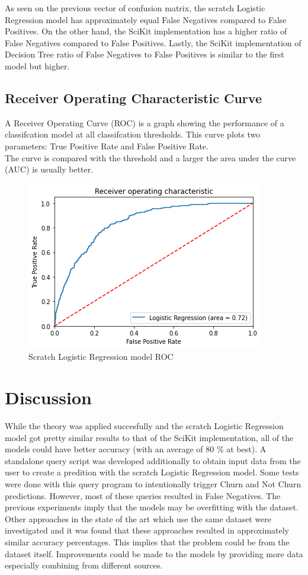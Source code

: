\documentclass[letterpaper, 10 pt, conference]{ieeeconf}
\begin{document}
As seen on the previous vector of confusion matrix, the scratch Logistic Regression model has approximately equal False Negatives compared to False Positives.
On the other hand, the SciKit implementation has a higher ratio of False Negatives compared to False Positives.
Lastly, the SciKit implementation of Decision Tree ratio of False Negatives to False Positives is similar to the first model but higher. 

\subsection{Receiver Operating Characteristic Curve}

A Receiver Operating Curve (ROC) is a graph showing the performance of a classifcation model at all classifcation thresholds. This curve
plots two parameters: True Positive Rate and False Positive Rate. \\

The curve is compared with the threshold and a larger the area under the curve (AUC) is usually better.

\begin{figure}[thpb]
    \centering
    \includegraphics[scale=0.5]{figures/LOR.png}
    \caption{Scratch Logistic Regression model ROC}
    \label{LOR}
 \end{figure}

 
\section{ Discussion }
While the theory was applied succesfully and the scratch Logistic Regression model got pretty similar results to that of the SciKit implementation,
all of the models could have better accuracy (with an average of 80 \% at best). A standalone query script was developed additionally to 
obtain input data from the user to create a predition with the scratch Logistic Regression model. Some tests were done with this query program
to intentionally trigger Churn and Not Churn predictions. However, most of these queries resulted in False Negatives. The previous experiments 
imply that the models may be overfitting with the dataset. Other approaches in the state of the art which use the same dataset were investigated and it was found
that these approaches resulted in approximately similar accuracy percentages. This implies that the problem could be from the dataset itself. 
Improvements could be made to the models by providing more data especially combining from different sources.
\end{document}
